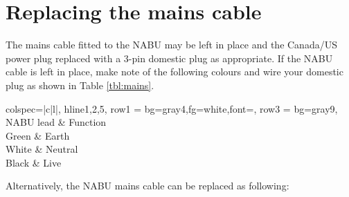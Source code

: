 \section{Replacing the mains cable}
The mains cable fitted to the NABU may be left in place and the Canada/US power plug replaced with a 3-pin domestic plug as appropriate. If the NABU cable is left in place, make note of the following colours and wire your domestic plug as shown in Table \ref{tbl:mains}.
\begin{center}
	\sffamily
	\begin{tblr}{
			colspec={|c|l|},
			hline{1,2,5},
			row{1} = {bg=gray4,fg=white,font=\bfseries},
			row{3} = {bg=gray9},
		}
		NABU lead & Function \\
		Green & Earth \\
		White & Neutral \\
		Black & Live \\
	\end{tblr}
\end{center}
Alternatively, the NABU mains cable can be replaced as following:
